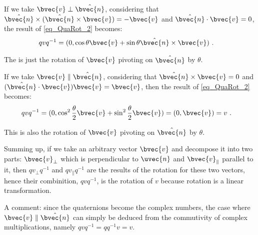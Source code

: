 If we take $\bvec{v}\perp\hat{\bvec{n}}$, considering that $\hat{\bvec{n}}\times(\hat{\bvec{n}}\times\bvec{v})=-\bvec{v}$ and $\hat{\bvec{n}}\cdot\bvec{v}=0$, the result of \autoref{eq_QuaRot_2} becomes: 
\begin{equation}
\begin{aligned}
qvq^{-1}&=(0, \cos\theta\bvec{v}+\sin\theta\hat{\bvec{n}}\times\bvec{v})~.
\end{aligned}
\end{equation}

The is just the rotation of $\bvec{v}$ pivoting on $\hat{\bvec{n}}$ by $\theta$. 

If we take $\bvec{v}\parallel\hat{\bvec{n}}$, considering that $\hat{\bvec{n}}\times\bvec{v}=0$ and $(\hat{\bvec{n}}\cdot\bvec{v})\bvec{v}=\bvec{v}$, then the result of \autoref{eq_QuaRot_2} becomes: 
\begin{equation}
\begin{aligned}
qvq^{-1}&=(0, \cos^2\frac{\theta}{2}\bvec{v}+\sin^2\frac{\theta}{2}\bvec{v})=(0, \bvec{v})=v~.
\end{aligned}
\end{equation}

This is also the rotation of $\bvec{v}$ pivoting on $\hat{\bvec{n}}$ by $\theta$. 

Summing up, if we take an arbitrary vector $\bvec{v}$ and decompose it into two parts: $\bvec{v}_\perp$ which is perpendicular to $\uvec{n}$ and $\bvec{v}_\parallel$ parallel to it, then $q v_\perp q^{-1}$ and $q v_\parallel q^{-1}$ are the results of the rotation for these two vectors, hence their combinition, $qvq^{-1}$, is the rotation of $v$ because rotation is a linear transformation. 

A comment: since the quaternions become the complex numbers, the case where $\bvec{v}\parallel\hat{\bvec{n}}$ can simply be deduced from the commutivity of complex multiplications, namely $qvq^{-1}=qq^{-1}v=v$. 


